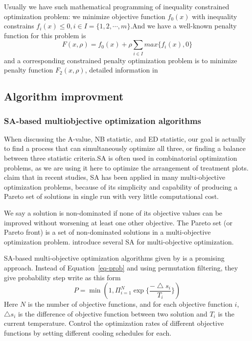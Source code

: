 \documentclass[
  a4paper,
  oneside,
  openany,
  12pt,
  onecolumn]{book}
\theoremstyle{definition}
\theoremstyle{definition}
\theoremstyle{plain}
\theoremstyle{remark}
\begin{document}
Usually we have such mathematical programming of inequality constrained
optimization problem: we minimize objective function \(f_0(x)\) with
inequality constrains \(f_i(x)\leq 0, i\in I=\{1,2,\cdots,m\}\).And we
have a well-known penalty function for this problem is \[
F (x, \rho) = f_0(x) + \rho \sum_{i\in I}max\{f_i(x),0\}
\] and a corresponding constrained penalty optimization problem is to
minimize penalty function \(F_2 (x, \rho)\), detailed information in
\citet{meng2013exactness}

\subsection{Algorithm improvment}\label{algorithm-improvment}

\subsubsection{SA-based multiobjective optimization
algorithms}\label{sa-based-multiobjective-optimization-algorithms}

When discussing the A-value, NB statistic, and ED statistic, our goal is
actually to find a process that can simultaneously optimize all three,
or finding a balance between three statistic criteria.SA is often used
in combinatorial optimization problems, as we are using it here to
optimize the arrangement of treatment plots. \citet{suman2006survey}
claim that in recent studies, SA has been applied in many
multi-objective optimization problems, because of its simplicity and
capability of producing a Pareto set of solutions in single run with
very little computational cost.

We say a solution is non-dominated if none of its objective values can
be improved without worsening at least one other objective. The Pareto
set (or Pareto front) is a set of non-dominated solutions in a
multi-objective optimization problem. \citet{suman2006survey} introduce
several SA for multi-objective optimization.

SA-based multi-objective optimization algorithms given by
\citet{suppapitnarm2000simulated} is a promising approach. Instead of
Equation~\ref{eq-prob} and using permutation filtering, they give
probability step write as this form \[
P = \min(1, \Pi_{i=1}^N\exp\{\frac{-\bigtriangleup s_i}{T_i}\})
\] Here \(N\) is the number of objective functions, and for each
objective function \(i\), \(\bigtriangleup s_i\) is the difference of
objective function between two solution and \(T_i\) is the current
temperature. Control the optimization rates of different objective
functions by setting different cooling schedules for each.
\end{document}
